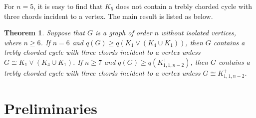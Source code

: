 \documentclass[12pt]{article}
\newtheorem {theorem} {Theorem}[section]
\begin{document}
For $n=5$, it is easy to find that $K_5$ does not contain a trebly chorded cycle with three chords incident to a vertex. The main result is listed as below.



\begin{theorem}\label{doubly21}
Suppose that $G$ is a graph of order $n$ without isolated vertices, where $n\ge 6$.
If $n=6$ and $q(G)\ge q(K_1\vee (K_4\cup K_1))$, then $G$ contains a trebly chorded cycle with three chords incident to a vertex unless $G\cong K_1\vee (K_4\cup K_1)$.
If $n\ge 7$ and $q(G)\ge q(K_{1,1,n-2}^+)$, then $G$ contains a trebly chorded cycle with three chords incident to a vertex unless $G\cong K_{1,1,n-2}^+$. %
\end{theorem}



%




\section{Preliminaries}
\end{document}
